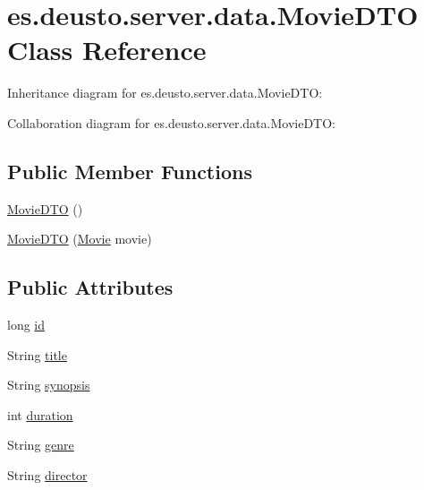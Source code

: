\hypertarget{classes_1_1deusto_1_1server_1_1data_1_1_movie_d_t_o}{}\section{es.\+deusto.\+server.\+data.\+Movie\+D\+TO Class Reference}
\label{classes_1_1deusto_1_1server_1_1data_1_1_movie_d_t_o}


Inheritance diagram for es.\+deusto.\+server.\+data.\+Movie\+D\+TO\+:


Collaboration diagram for es.\+deusto.\+server.\+data.\+Movie\+D\+TO\+:
\subsection*{Public Member Functions}
\begin{DoxyCompactItemize}
\item 
\mbox{\hyperlink{classes_1_1deusto_1_1server_1_1data_1_1_movie_d_t_o_a8dab5027de00475ceb896ad89af993b7}{Movie\+D\+TO}} ()
\item 
\mbox{\hyperlink{classes_1_1deusto_1_1server_1_1data_1_1_movie_d_t_o_ad09b9cd627c8906f7ab7fe86d09b9e75}{Movie\+D\+TO}} (\mbox{\hyperlink{classes_1_1deusto_1_1server_1_1jdo_1_1_movie}{Movie}} movie)
\end{DoxyCompactItemize}
\subsection*{Public Attributes}
\begin{DoxyCompactItemize}
\item 
long \mbox{\hyperlink{classes_1_1deusto_1_1server_1_1data_1_1_movie_d_t_o_a10965da25463f1f31f577279a8f42d88}{id}}
\item 
String \mbox{\hyperlink{classes_1_1deusto_1_1server_1_1data_1_1_movie_d_t_o_a09c5f5a8f9408f34e339e7149152839d}{title}}
\item 
String \mbox{\hyperlink{classes_1_1deusto_1_1server_1_1data_1_1_movie_d_t_o_a0d2474dd25e99046fdb05287ebd866b6}{synopsis}}
\item 
int \mbox{\hyperlink{classes_1_1deusto_1_1server_1_1data_1_1_movie_d_t_o_a0b00d6d86e21f93553c2d1fb1f5d846f}{duration}}
\item 
String \mbox{\hyperlink{classes_1_1deusto_1_1server_1_1data_1_1_movie_d_t_o_af613fe128f886f49ea14dcfbf57c5355}{genre}}
\item 
String \mbox{\hyperlink{classes_1_1deusto_1_1server_1_1data_1_1_movie_d_t_o_ace982fc1521c6e8fe3cf551f7bb85674}{director}}
\end{DoxyCompactItemize}


